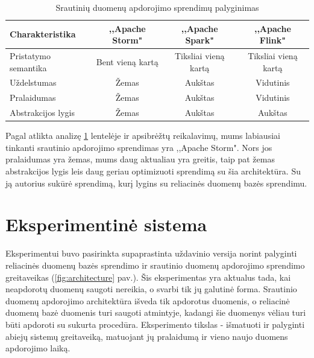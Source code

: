 \documentclass{VUMIFPSkursinis}
\begin{document}
\begin{table}[!htbp]
    \begin{center}
        \caption{Srautinių duomenų apdorojimo sprendimų palyginimas}
        \label{table:comparer}
        \begin{tabular}{ | l | c | c | c | } 
            \hline
            Charakteristika & ,,Apache Storm" & ,,Apache Spark" & ,,Apache Flink" \\* \hline
            Pristatymo semantika & Bent vieną kartą & Tiksliai vieną kartą & Tiksliai vieną kartą \\* \hline
            Uždelstumas & Žemas & Aukštas & Vidutinis \\* \hline
            Pralaidumas & Žemas & Aukštas & Vidutinis \\* \hline
            Abstrakcijos lygis & Žemas & Aukštas & Aukštas \\* \hline
        \end{tabular}
    \end{center}
\end{table}\par

Pagal atlikta analizę \ref{table:comparer} lentelėje ir apsibrėžtų reikalavimų, mums labiausiai tinkanti srautinio apdorojimo sprendimas yra ,,Apache Storm". 
Nors jos pralaidumas yra žemas, mums daug aktualiau yra greitis, taip pat žemas abstrakcijos lygis leis daug geriau optimizuoti sprendimą su šia architektūra. Su ją autorius
sukūrė sprendimą, kurį lygins su reliacinės duomenų bazės sprendimu.

\section{Eksperimentinė sistema}

Eksperimentui buvo pasirinkta supaprastinta uždavinio versija norint palyginti reliacinės duomenų bazės sprendimo ir srautinio duomenų 
apdorojimo sprendimo greitaveikas (\ref{fig:architecture} pav.).
Šis eksperimentas yra aktualus tada, kai neapdorotų duomenų saugoti nereikia, o svarbi tik jų galutinė forma. Srautinio duomenų apdorojimo architektūra
išveda tik apdorotus duomenis, o reliacinė duomenų bazė duomenis turi saugoti atmintyje, kadangi šie duomenys vėliau turi būti apdoroti su sukurta 
procedūra. Eksperimento tikslas - išmatuoti ir palyginti abiejų sistemų greitaveiką, matuojant jų pralaidumą ir vieno naujo duomens apdorojimo laiką.
\end{document}
